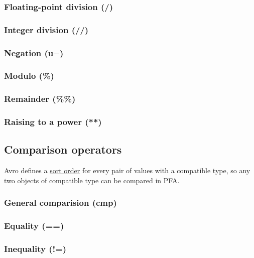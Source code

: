 \documentclass{article}
\theoremstyle{definition}
\begin{document}
\subsubsection{Floating-point division (/)}

\subsubsection{Integer division (//)}

\subsubsection{Negation (u$-$)}

\subsubsection{Modulo (\%)}

\subsubsection{Remainder (\%\%)}

\subsubsection{Raising to a power (**)}

\subsection{Comparison operators}

Avro defines a \href{http://avro.apache.org/docs/1.7.6/spec.html#order}{sort order} for every pair of values with a compatible type, so any two objects of compatible type can be compared in PFA.

\subsubsection{General comparision (cmp)}

\subsubsection{Equality (==)}

\subsubsection{Inequality (!=)}
\end{document}
